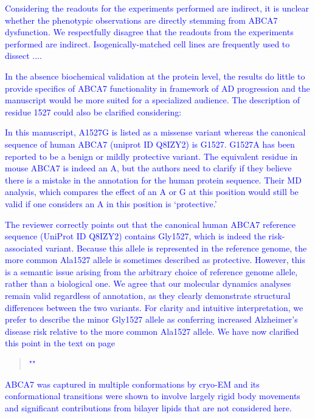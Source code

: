 \textcolor{blue}{

Considering the readouts for the experiments performed are indirect, it is unclear whether the phenotypic observations are directly stemming from ABCA7 dysfunction. 
\textcolor{blue}{We respectfully disagree that the readouts from the experiments performed are indirect. Isogenically-matched cell lines are frequently used to dissect ....}

In the absence biochemical validation at the protein level, the results do little to provide specifics of ABCA7 functionality in framework of AD progression and the manuscript would be more suited for a specialized audience. The description of residue 1527 could also be clarified considering:

In this manuscript, A1527G is listed as a missense variant whereas the canonical sequence of human ABCA7 (uniprot ID Q8IZY2) is G1527. G1527A has been reported to be a benign or mildly protective variant. The equivalent residue in mouse ABCA7 is indeed an A, but the authors need to clarify if they believe there is a mistake in the annotation for the human protein sequence. Their MD analysis, which compares the effect of an A or G at this position would still be valid if one considers an A in this position is ‘protective.’

\textcolor{blue}{The reviewer correctly points out that the canonical human ABCA7 reference sequence (UniProt ID Q8IZY2) contains Gly1527, which is indeed the risk-associated variant. Because this allele is represented in the reference genome, the more common Ala1527 allele is sometimes described as protective. However, this is a semantic issue arising from the arbitrary choice of reference genome allele, rather than a biological one. We agree that our molecular dynamics analyses remain valid regardless of annotation, as they clearly demonstrate structural differences between the two variants. For clarity and intuitive interpretation, we prefer to describe the minor Gly1527 allele as conferring increased Alzheimer's disease risk relative to the more common Ala1527 allele. We have now clarified this point in the text on page~\pageref{quoteL-label}}

\begin{quote}
	\textcolor{blue}{"}\quoteL\textcolor{blue}{"}\\
\end{quote}

ABCA7 was captured in multiple conformations by cryo-EM and its conformational transitions were shown to involve largely rigid body movements and significant contributions from bilayer lipids that are not considered here. 

}
